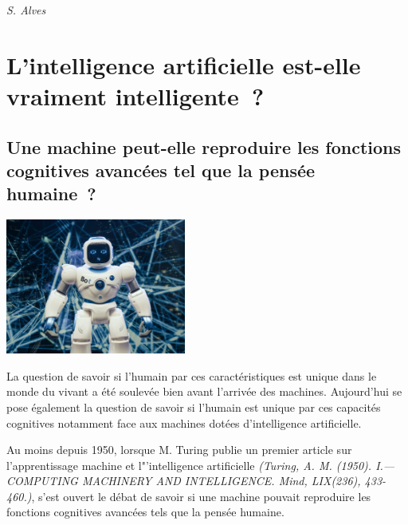\documentclass[
  10pt,
  french,
  a5paper,
  openany]{book}
\newenvironment{signature}{\begin{flushright}}{\end{flushright}}
\begin{document}
\begin{signature}
\emph{S. Alves}

\end{signature}

\hypertarget{lintelligence-artificielle-est-elle-vraiment-intelligente}{%
\chapter{\texorpdfstring{L'intelligence artificielle \linebreak est-elle vraiment intelligente~?}{L'intelligence artificielle est-elle vraiment intelligente~?}}\label{lintelligence-artificielle-est-elle-vraiment-intelligente}}

\hypertarget{une-machine-peut-elle-reproduire-les-fonctions-cognitives-avancuxe9es-tel-que-la-pensuxe9e-humaine}{%
\section{Une machine peut-elle reproduire les fonctions cognitives avancées tel que la pensée humaine~?}\label{une-machine-peut-elle-reproduire-les-fonctions-cognitives-avancuxe9es-tel-que-la-pensuxe9e-humaine}}

\begin{center}
\includegraphics[width=\textwidth,height=12em]{images/intelligence-artificelle.jpeg}

\end{center}

La question de savoir si l'humain par ces caractéristiques est unique dans le monde du vivant a été soulevée bien avant l'arrivée des machines. Aujourd'hui se pose également la question de savoir si l'humain est unique par ces capacités cognitives notamment face aux machines dotées d'intelligence artificielle.

Au moins depuis 1950, lorsque M. Turing publie un premier article sur l'apprentissage machine et l"'intelligence artificielle \emph{(Turing, A. M. (1950). I.---COMPUTING MACHINERY AND INTELLIGENCE. Mind, LIX(236), 433-460.)}, s'est ouvert le débat de savoir si une machine pouvait reproduire les fonctions cognitives avancées tels que la pensée humaine.
\end{document}
